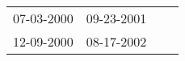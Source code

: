 \begin{supertabular}{llll}
 07-03-2000 &  09-23-2001 \\
 12-09-2000 &  08-17-2002 \\
\end{supertabular}
